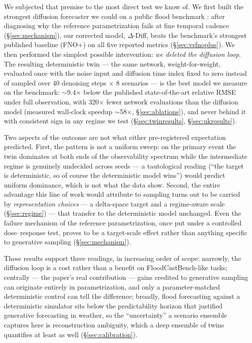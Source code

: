 \documentclass[11pt]{article}
\newcommand{\ours}{\mbox{$\Delta$-Diff}}
\begin{document}
We subjected that premise to the most direct test we know of. We first
built the strongest diffusion forecaster we could on a public flood
benchmark \citep{floodcastbench2025}: after diagnosing why the reference
parametrization fails at fine temporal cadence (\S\ref{sec:mechanism}),
our corrected model, \ours{}, beats the benchmark's strongest published
baseline (FNO+) on all five reported metrics (\S\ref{sec:vsfnoplus}). We
then performed the simplest possible intervention: \emph{we deleted the
diffusion loop}. The resulting deterministic twin --- the same network,
weight-for-weight, evaluated once with the noise input and diffusion time
index fixed to zero instead of sampled over 40 denoising steps $\times$ 8
scenarios --- is the best model we measure on the benchmark:
$\sim$9.4$\times$ below the published state-of-the-art relative RMSE
under full observation, with 320$\times$ fewer network evaluations than
the diffusion model (measured wall-clock speedup $\sim$58$\times$,
\S\ref{sec:ablations}), and never behind it with consistent sign in any
regime we test (\S\ref{sec:twinresults}, \S\ref{sec:ukresults}).

Two aspects of the outcome are not what either pre-registered expectation
predicted. First, the pattern is not a uniform sweep: on the primary
event the twin dominates at both ends of the observability spectrum while
the intermediate regime is genuinely undecided across seeds --- a
tautological reading (``the target is deterministic, so of course the
deterministic model wins'') would predict uniform dominance, which is not
what the data show. Second, the entire advantage this line of work would
attribute to sampling turns out to be carried by \emph{representation
choices} --- a delta-space target and a regime-aware scale
(\S\ref{sec:regime}) --- that transfer to the deterministic model
unchanged. Even the failure mechanism of the reference parametrization,
once put under a controlled dose--response test, proves to be a
target-scale effect rather than anything specific to generative sampling
(\S\ref{sec:mechanism}).

These results support three readings, in increasing order of scope:
narrowly, the diffusion loop is a cost rather than a benefit on
FloodCastBench-like tasks; centrally --- the paper's real contribution
--- gains credited to generative sampling can originate entirely in
parametrization, and only a parameter-matched deterministic control can
tell the difference; broadly, flood forecasting against a deterministic
simulator sits below the predictability horizon that justified generative
forecasting in weather, so the ``uncertainty'' a scenario ensemble
captures here is reconstruction ambiguity, which a deep ensemble of
twins quantifies at least as well (\S\ref{sec:calibration}).
\end{document}
